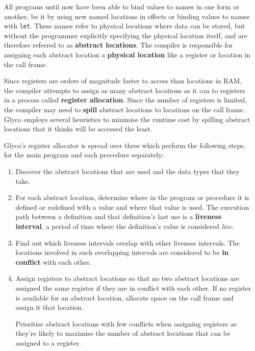\documentclass[main.tex]{subfiles}
\begin{document}
All programs until now have been able to bind values to names in one form or another, be it by using new named locations in effects or binding values to names with \texttt{let}. These names refer to physical locations where data can be stored, but without the programmer explicitly specifying the physical location itself, and are therefore referred to as \textbf{abstract locations}. The compiler is responsible for assigning each abstract location a \textbf{physical location} like a register or location in the call frame.

Since registers are orders of magnitude faster to access than locations in RAM, the compiler attempts to assign as many abstract locations as it can to registers in a process called \textbf{register allocation}. Since the number of registers is limited, the compiler may need to \textbf{spill} abstract locations to locations on the call frame. Glyco employs several heuristics to minimise the runtime cost by spilling abstract locations that it thinks will be accessed the least.

Glyco's register allocator is spread over three  which perform the following steps, for the main program and each procedure separately:
\begin{enumerate}
	\item Discover the abstract locations that are used and the data types that they take.
	\item For each abstract location, determine where in the program or procedure it is defined or redefined with a value and where that value is used. The execution path between a definition and that definition's last use is a \textbf{liveness interval}, a period of time where the definition's value is considered \emph{live}.
	\item Find out which liveness intervals overlap with other liveness intervals. The locations involved in such overlapping intervals are considered to be \textbf{in conflict} with each other.
	\item Assign registers to abstract locations so that no two abstract locations are assigned the same register if they are in conflict with each other. If no register is available for an abstract location, allocate space on the call frame and assign it that location.
	
	Prioritise abstract locations with few conflicts when assigning registers as they're likely to maximise the number of abstract locations that can be assigned to a register.
\end{enumerate}
\end{document}
